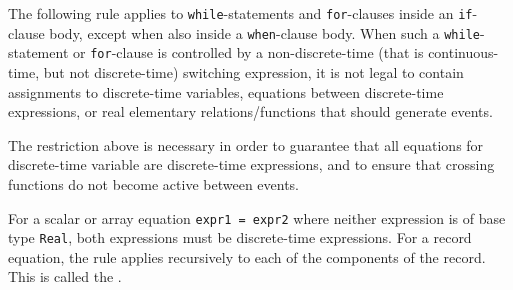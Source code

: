 The following rule applies to \lstinline!while!-statements and \lstinline!for!-clauses inside an \lstinline!if!-clause body, except when also inside a \lstinline!when!-clause body.
When such a \lstinline!while!-statement or \lstinline!for!-clause is controlled by a non-discrete-time (that is continuous-time, but not discrete-time) switching expression, it is not legal to contain assignments to discrete-time variables, equations between discrete-time expressions, or real elementary relations/functions that should generate events.

\begin{nonnormative}
The restriction above is necessary in order to guarantee that all equations for discrete-time variable are discrete-time expressions, and to ensure that crossing functions do not become active between events.
\end{nonnormative}

For a scalar or array equation \lstinline!expr1 = expr2! where neither expression is of base type \lstinline!Real!, both expressions must be discrete-time expressions.
For a record equation, the rule applies recursively to each of the components of the record.
This is called the .


